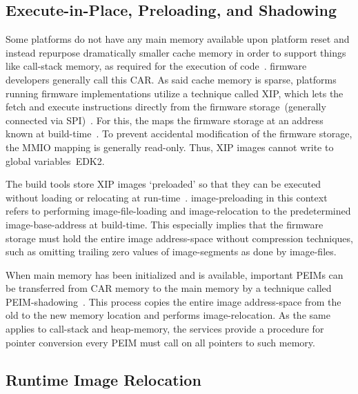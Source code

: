 \subsection{Execute-in-Place, Preloading, and Shadowing}
\label{sec:peim_reqs}

Some platforms do not have any main memory available upon platform reset and instead repurpose dramatically smaller cache memory in order to support things like \gls{call-stack} memory, as required for the execution of  code~\cite{pi-spec,ISO:2018:III}. \Gls{firmware} developers generally call this \gls{CAR}. As said cache memory is sparse,  platforms running  \gls{firmware} implementations utilize a technique called \gls{XIP}, which lets the  fetch and execute instructions directly from the \gls{firmware} storage~(generally connected via \gls{SPI})~\cite{pi-spec}. For this, the  maps the \gls{firmware} storage at an address known at build-time~\cite{ia32}. To prevent accidental modification of the \gls{firmware} storage, the \gls{MMIO} mapping is generally read-only. Thus, \gls{XIP} \glspl{image} cannot write to global variables~\gls{EDK2}.

The build tools store \gls{XIP} \glspl{image} `preloaded' so that they can be executed without loading or relocating at run-time~\cite{pi-spec,edk2}. \Gls{image-preloading} in this context refers to performing \gls{image-file-loading} and \gls{image-relocation} to the predetermined \gls{image-base-address} at build-time. This especially implies that the \gls{firmware} storage must hold the entire \gls{image} \gls{address-space} without compression techniques, such as omitting trailing zero values of \glspl{image-segment} as done by \glspl{image-file}.

When main memory has been initialized and is available, important \glspl{PEIM} can be transferred from \gls{CAR} memory to the main memory by a technique called \gls{PEIM-shadowing}~\cite{pi-spec}. This process copies the entire \gls{image} \gls{address-space} from the old to the new memory location and performs \gls{image-relocation}. As the same applies to \gls{call-stack} and \gls{heap-memory}, the  services provide a procedure for pointer conversion every \gls{PEIM} must call on all pointers to such memory.

\subsection{Runtime Image Relocation}

